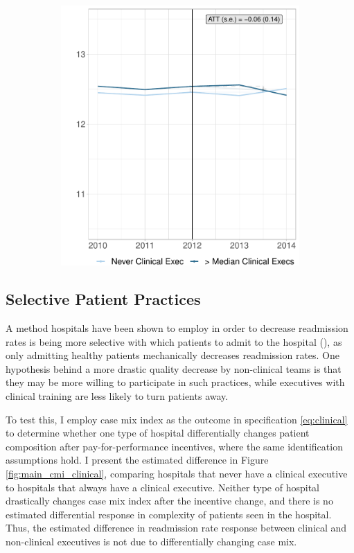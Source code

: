 \documentclass[12pt]{article}
\begin{document}
\begin{figure}[ht!]
\begin{subfigure}[b]{0.45\textwidth}
         \includegraphics[width=\textwidth]{Objects/cont_abovemedmort_md_nomd_size_synth_graph.pdf}
         \label{fig:abovemed_read_synth_clinical}
     \end{subfigure}
        \label{fig:cont_clinicalsynthdid_size}
    \end{figure}


    

    \subsection{Selective Patient Practices}\label{app:casemix}

    A method hospitals have been shown to employ in order to decrease readmission rates is being more selective with which patients to admit to the hospital (\cite{gupta2021impacts}), as only admitting healthy patients mechanically decreases readmission rates. One hypothesis behind a more drastic quality decrease by non-clinical teams is that they may be more willing to participate in such practices, while executives with clinical training are less likely to turn patients away. 

    To test this, I employ case mix index as the outcome in specification \ref{eq:clinical} to determine whether one type of hospital differentially changes patient composition after pay-for-performance incentives, where the same identification assumptions hold. I present the estimated difference in Figure \ref{fig:main_cmi_clinical}, comparing hospitals that never have a clinical executive to hospitals that always have a clinical executive. Neither type of hospital drastically changes case mix index after the incentive change, and there is no estimated differential response in complexity of patients seen in the hospital. Thus, the estimated difference in readmission rate response between clinical and non-clinical executives is not due to differentially changing case mix. 
\end{document}
